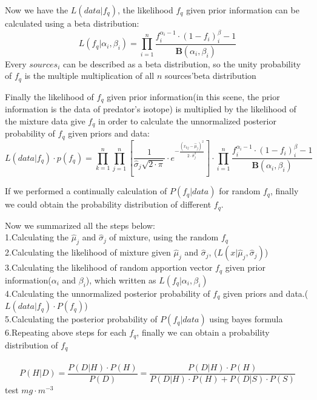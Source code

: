 \documentclass{article}
\begin{document}
\par Now we have the $L(data | f_{q})$, the likelihood $f_q$ given prior information can be calculated using a beta distribution:
\begin{displaymath}
L(f_q | \alpha_i, \beta_i) = \prod_{i=1}^{n}\frac{f_i^{\alpha_i-1}\cdot(1-f_i)^\beta_i-1}{\textbf{B}(\alpha_i,\beta_i)}
\end{displaymath}
Every $sources_i$ can be described as a beta distribution, so the unity probability of $f_q$ is the multiple multiplication of all $n$ sources'beta distribution\\
\par Finally the likelihood of $f_q$ given prior information(in this scene, the prior information is the data of predator's isotope) is multiplied by the likelihood of the mixture data give $f_q$ in order to calculate the unnormalized posterior probability of $f_q$ given priors and data:
\begin{displaymath}
L(data|f_{q})\cdot p(f_q) = \prod\limits_ {k=1}^{n}\prod\limits_{j=1}^{n}\left[\frac{1}{\hat\sigma_{j}\sqrt{2\cdot\pi}}\cdot e^{-\frac{(x_{kj} - \hat\mu_j)^2}{2\cdot\hat\sigma^2_j}}\right] \cdot \prod_{i=1}^{n}\frac{f_i^{\alpha_i-1}\cdot(1-f_i)^\beta_i-1}{\textbf{B}(\alpha_i,\beta_i)}
\end{displaymath}
\par If we performed a continually calculation of $P(f_q|data)$ for random $f_q$, finally we could obtain the probability distribution of different $f_q$.
\par Now we summarized all the steps below:\\
1.\qquad Calculating the $\hat\mu_j$ and $\hat\sigma_j$ of mixture, using the random $f_q$\\
2.\qquad Calculating the likelihood of mixture given $\hat\mu_j$ and $\hat\sigma_j$, ($L(x|\hat\mu_j, \hat\sigma_j)$)\\
3.\qquad Calculating the likelihood of random apportion vector $f_q$ given prior information($\alpha_i$ and $\beta_i$), which written as $L(f_q | \alpha_i, \beta_i)$\\
4.\qquad Calculating the unnormalized posterior probability of $f_q$ given priors and data.($L(data|f_q)\cdot P(f_q)$)\\
5.\qquad Calculating the posterior probability of $P(f_q|data)$ using bayes formula\\
6.\qquad Repeating above steps for each $f_q$, finally we can obtain a probability distribution of $f_q$\\
\\
\begin{displaymath}
P(H|D) = \frac{P(D|H)\cdot P(H)}{P(D)}=\frac{P(D|H)\cdot P(H)}{P(D|H)\cdot P(H) + P(D|S)\cdot P(S)}
\end{displaymath}
test $mg\cdot m^{-3}$
\end{document}
